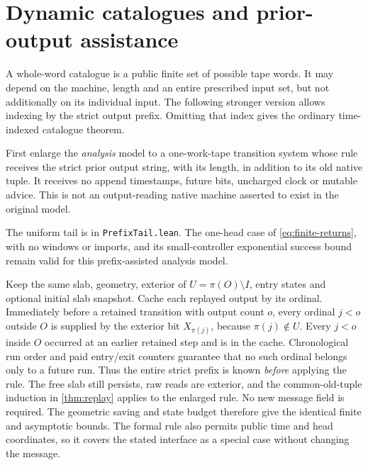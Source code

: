 \section{Dynamic catalogues and prior-output assistance}\label{sec:catalogues}

A whole-word catalogue is a public finite set of possible tape words. It
may depend on the machine, length and an entire prescribed input set, but
not additionally on its individual input. The following stronger version
allows indexing by the strict output prefix. Omitting that index gives the
ordinary time-indexed catalogue theorem.

First enlarge the \emph{analysis} model to a one-work-tape transition system
whose rule receives the strict prior output string, with its length, in
addition to its old native tuple. It receives no append timestamps, future
bits, uncharged clock or mutable advice. This is not an output-reading native
machine asserted to exist in the original model.

\begin{lemma}\label{lem:prefix-replay}
The uniform tail is  in
\texttt{PrefixTail.lean}.
The one-head case of \cref{eq:finite-returns}, with no windows or imports,
and its small-controller exponential success bound remain valid for this
prefix-assisted analysis model.
\end{lemma}
\begin{outline}
Keep the same slab, geometry, exterior of $U=\pi(O)\setminus I$, entry
states and optional initial slab snapshot. Cache each replayed output by its
ordinal. Immediately before a retained transition with output count $o$,
every ordinal $j<o$ outside $O$ is supplied by the exterior bit
$X_{\pi(j)}$, because $\pi(j)\notin U$. Every $j<o$ inside $O$ occurred
at an earlier retained step and is in the cache. Chronological run order
and paid entry/exit counters guarantee that no such ordinal belongs only
to a future run. Thus the entire strict prefix is known \emph{before}
applying the rule. The free slab still persists, raw reads are exterior,
and the common-old-tuple induction in \cref{thm:replay} applies to the
enlarged rule. No new message field is required. The geometric saving and
state budget therefore give the identical finite and asymptotic bounds.
The formal rule also permits public time and head coordinates, so it covers
the stated interface as a special case without changing the message.
\end{outline}


